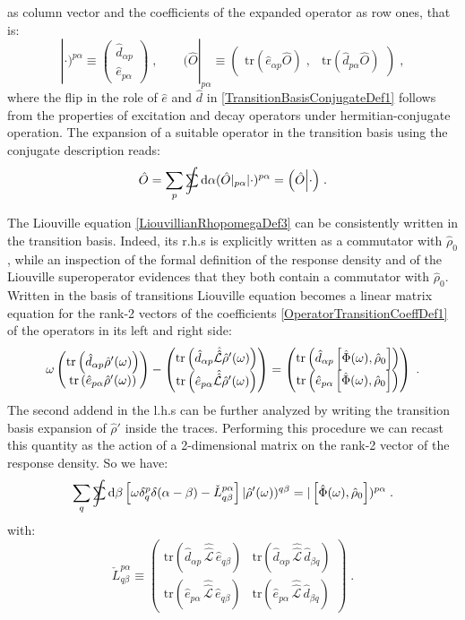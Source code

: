 \documentclass[a4paper]{article}
\newcommand{\dd}{{\rm d}}
\newcommand{\sint}{\mathrlap{\displaystyle\int}
\mathrlap{\textstyle\sum}
\phantom{\mathrlap{\displaystyle
\int}\textstyle\sum}}
\newcommand{\be}{\begin{equation}}
\newcommand{\ee}{\end{equation}}
\newcommand{\nn}{\notag}
\newcommand{\qq}{\qquad}
\newcommand{\lb}{\label}
\newcommand{\mat}[1]{\begin{pmatrix} #1\end{pmatrix}}
\newcommand{\op}[1]{\hat {#1}}
\newcommand{\sop}[1]{\op{\op {#1}}}
\newcommand{\commutator}[2]{\left[ {#1} , {#2} \right]}
\newcommand{\trace}[1]{\mathrm{tr}\left(#1\right)}
\newcommand{\optr}[1]{\check #1}
\newcommand{\sket}[2]{| #2)^{#1}}
\newcommand{\sbra}[2]{( #2|_{#1}}
\newcommand{\dbraket}[2]{\Bigl(#1 \Bigl| #2 \Bigr)}
\newcommand{\dmnot}{\op{\rho}_0}
\newcommand{\dm}{\op{\rho}}
\newcommand{\excite}[2]{\op e_{{#1}{#2}}}
\newcommand{\decay}[2]{\op d_{{#1}{#2}}}
\newcommand{\Liouv}{\sop{\mathcal L}}
\begin{document}
as column vector and the coefficients of the expanded operator as row ones, that is: 
\be\lb{TransitionBasisConjugateDef1}
\sket{p\alpha}{\cdot} \equiv 
\mat{\decay{\alpha}{p} \\  \excite{p}{\alpha}} \;, \qq
\sbra{p\alpha}{\op O}  \equiv 
\mat{ \trace{\excite{\alpha}{p}\op O } \;, & \trace{\decay{p}{\alpha}\op O} }
\;,
\ee
where the flip in the role of $\op e$ and $\op d$ in \eqref{TransitionBasisConjugateDef1} follows from the properties of excitation and decay operators
under hermitian-conjugate operation. The expansion of a suitable operator in the transition basis using the conjugate description reads: 
\be\lb{OperatorTransBasisConjugateExpDef1}
\op O = \sum_p\sint \dd \alpha \sbra{p\alpha}{\op O}\sket{p\alpha}{\cdot} = 
\dbraket{\op O}{\cdot} \;.
\ee


The Liouville equation \eqref{LiouvillianRhopomegaDef3} can be consistently written in the transition basis. Indeed, its r.h.s is explicitly written
as a commutator with $\dmnot$, while an inspection of the formal definition of the response density and of the Liouville superoperator evidences that
they both contain a commutator with $\dmnot$. Written in the basis of transitions Liouville equation becomes a linear matrix equation for the rank-2 
vectors of the coefficients \eqref{OperatorTransitionCoeffDef1} of the operators in its left and right side:
\be
\omega\mat{ \trace{\decay{\alpha}{p}\dm'(\omega)} \\ \trace{\excite{p}{\alpha}\dm'(\omega)}} - 
\mat{ \trace{\decay{\alpha}{p}\Liouv\dm'(\omega)} \\ \trace{\excite{p}{\alpha}\Liouv\dm'(\omega)}} =
\mat{ \trace{\decay{\alpha}{p}\commutator{\op\Phi(\omega)}{\dmnot}} \\ \trace{\excite{p}{\alpha}\commutator{\op\Phi(\omega)}{\dmnot}}}
\;.\nn
\ee
The second addend in the l.h.s can be further analyzed by writing the transition basis expansion of $\dm'$ inside the traces. Performing this procedure
we can recast this quantity as the action of a 2-dimensional matrix on the rank-2 vector of the response density. So we have: 
\be\lb{LiouvilleTransBasisDef1}
\sum_q\sint\dd\beta \left[\omega\delta_q^p\delta(\alpha-\beta)- \optr{L}^{p \alpha}_{q\beta} \right]\sket{q\beta}{\dm'(\omega)} =
\sket{p\alpha}{\commutator{\op\Phi(\omega)}{\dmnot}} \;.
\ee
with:
\be\lb{LiouvilleMatrixTransBasisDef1}
\optr{L}^{p \alpha}_{q\beta} \equiv \mat{\trace{\decay{\alpha}{p}\, \Liouv\, \excite{q}{\beta}} &
\trace{\decay{\alpha}{p}\, \Liouv\, \decay{\beta}{q}} \\
\trace{\excite{p}{\alpha}\, \Liouv\, \excite{q}{\beta}} &
\trace{\excite{p}{\alpha}\, \Liouv\, \decay{\beta}{q}}} \;.
\ee
\end{document}
